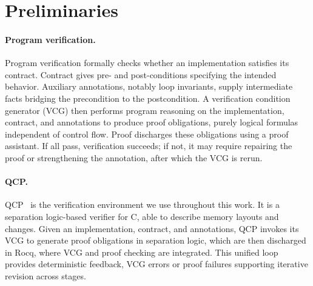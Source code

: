 \section{Preliminaries}
\label{sec:preliminaries}

\paragraph{Program verification.}
Program verification formally checks whether an implementation satisfies its contract.  Contract gives pre- and post-conditions specifying the intended behavior. Auxiliary annotations, notably loop invariants,  supply intermediate facts  bridging the precondition to the postcondition. A verification condition generator (VCG) then performs program reasoning on the implementation, contract, and annotations to produce proof obligations, purely logical formulas independent of control flow.  Proof discharges these obligations using a proof assistant. 
 If all pass, verification succeeds; if not, it may require repairing the proof or strengthening the annotation, after which the VCG is rerun.

\paragraph{QCP.}

QCP~\cite{wu2025qcppracticalseparationlogicbased} is the verification environment we use throughout this work. It is a separation logic-based verifier for C, able to describe memory layouts and changes.   Given an implementation, contract, and annotations, QCP invokes its VCG to generate proof obligations in separation logic, which are then discharged in Rocq, where VCG and proof checking are integrated. This unified loop provides deterministic feedback, VCG errors or proof failures supporting iterative revision across stages.


